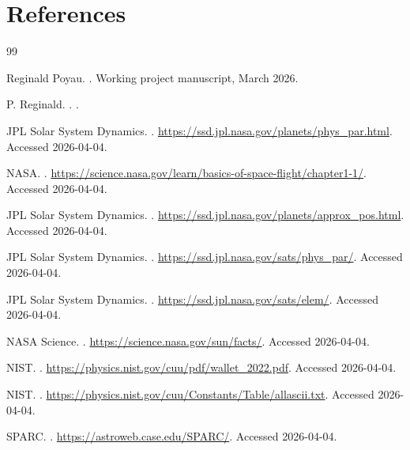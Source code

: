 \section{References}
\begin{thebibliography}{99}

Reginald Poyau.
.
\newblock Working project manuscript, March 2026.

P. Reginald.
.
.

JPL Solar System Dynamics.
.
\newblock \url{https://ssd.jpl.nasa.gov/planets/phys_par.html}. Accessed 2026-04-04.

NASA.
.
\newblock \url{https://science.nasa.gov/learn/basics-of-space-flight/chapter1-1/}. Accessed 2026-04-04.

JPL Solar System Dynamics.
.
\newblock \url{https://ssd.jpl.nasa.gov/planets/approx_pos.html}. Accessed 2026-04-04.

JPL Solar System Dynamics.
.
\newblock \url{https://ssd.jpl.nasa.gov/sats/phys_par/}. Accessed 2026-04-04.

JPL Solar System Dynamics.
.
\newblock \url{https://ssd.jpl.nasa.gov/sats/elem/}. Accessed 2026-04-04.

NASA Science.
.
\newblock \url{https://science.nasa.gov/sun/facts/}. Accessed 2026-04-04.

NIST.
.
\newblock \url{https://physics.nist.gov/cuu/pdf/wallet_2022.pdf}. Accessed 2026-04-04.

NIST.
.
\newblock \url{https://physics.nist.gov/cuu/Constants/Table/allascii.txt}. Accessed 2026-04-04.

SPARC.
.
\newblock \url{https://astroweb.case.edu/SPARC/}. Accessed 2026-04-04.


\end{thebibliography}
